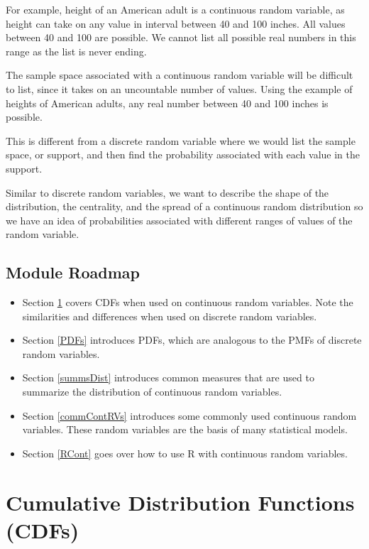 \documentclass[
]{book}
\providecommand{\tightlist}{%
  \setlength{\itemsep}{0pt}\setlength{\parskip}{0pt}}
\begin{document}
For example, height of an American adult is a continuous random variable, as height can take on any value in interval between 40 and 100 inches. All values between 40 and 100 are possible. We cannot list all possible real numbers in this range as the list is never ending.

The sample space associated with a continuous random variable will be difficult to list, since it takes on an uncountable number of values. Using the example of heights of American adults, any real number between 40 and 100 inches is possible.

This is different from a discrete random variable where we would list the sample space, or support, and then find the probability associated with each value in the support.

Similar to discrete random variables, we want to describe the shape of the distribution, the centrality, and the spread of a continuous random distribution so we have an idea of probabilities associated with different ranges of values of the random variable.

\hypertarget{module-roadmap-2}{%
\subsection{Module Roadmap}\label{module-roadmap-2}}

\begin{itemize}
\tightlist
\item
  Section \ref{contCDFs} covers CDFs when used on continuous random variables. Note the similarities and differences when used on discrete random variables.
\item
  Section \ref{PDFs} introduces PDFs, which are analogous to the PMFs of discrete random variables.
\item
  Section \ref{summsDist} introduces common measures that are used to summarize the distribution of continuous random variables.
\item
  Section \ref{commContRVs} introduces some commonly used continuous random variables. These random variables are the basis of many statistical models.
\item
  Section \ref{RCont} goes over how to use R with continuous random variables.
\end{itemize}

\hypertarget{contCDFs}{%
\section{Cumulative Distribution Functions (CDFs)}\label{contCDFs}}
\end{document}

